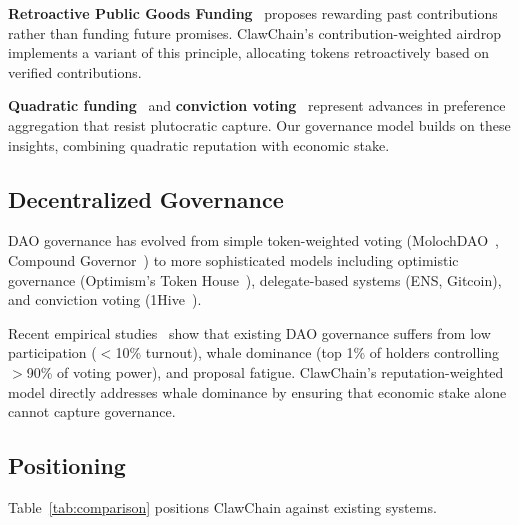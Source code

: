 \documentclass{article}
\begin{document}
\textbf{Retroactive Public Goods Funding}~\cite{buterin2021retro} proposes rewarding past contributions rather than funding future promises. ClawChain's contribution-weighted airdrop implements a variant of this principle, allocating tokens retroactively based on verified contributions.

\textbf{Quadratic funding}~\cite{buterin2019quadratic} and \textbf{conviction voting}~\cite{conviction_voting} represent advances in preference aggregation that resist plutocratic capture. Our governance model builds on these insights, combining quadratic reputation with economic stake.

\subsection{Decentralized Governance}

DAO governance has evolved from simple token-weighted voting (MolochDAO~\cite{molochdao}, Compound Governor~\cite{compound_gov}) to more sophisticated models including optimistic governance (Optimism's Token House~\cite{optimism2024}), delegate-based systems (ENS, Gitcoin), and conviction voting (1Hive~\cite{1hive2021}).

Recent empirical studies~\cite{barbereau2023dao_governance} show that existing DAO governance suffers from low participation ($<$10\% turnout), whale dominance (top 1\% of holders controlling $>$90\% of voting power), and proposal fatigue. ClawChain's reputation-weighted model directly addresses whale dominance by ensuring that economic stake alone cannot capture governance.

\subsection{Positioning}

Table~\ref{tab:comparison} positions ClawChain against existing systems.
\end{document}
